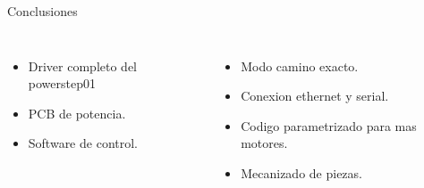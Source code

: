 \documentclass[aspectratio= 43]{beamer}
\begin{document}
\begin{frame}{Conclusiones}
   \begin{columns}
      \begin{itemize}
         \item{Driver completo del powerstep01}
         \item{PCB de potencia.}
         \item{Software de control.}
      \end{itemize}
      \begin{itemize}
         \item{Modo camino exacto.}
         \item{Conexion ethernet y serial.}
         \item{Codigo parametrizado para mas motores.}
         \item{Mecanizado de piezas.}
      \end{itemize}
   \end{columns}
\end{frame}
\end{document}
